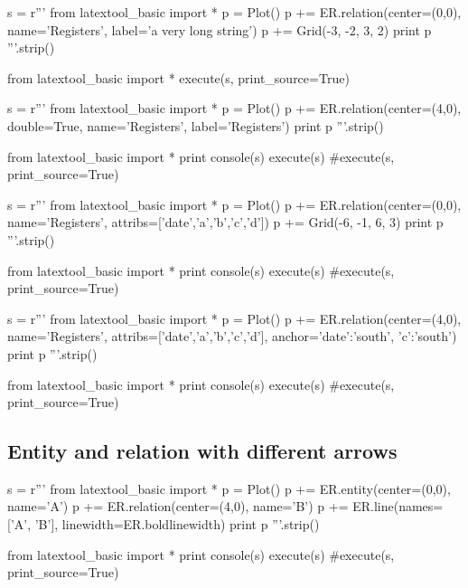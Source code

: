 \begin{python}
s = r'''
from latextool_basic import *
p = Plot()
p += ER.relation(center=(0,0), name='Registers', label='a very long string')
p += Grid(-3, -2, 3, 2)
print p
'''.strip()

from latextool_basic import *
execute(s, print_source=True)
\end{python}

\begin{python}
s = r'''
from latextool_basic import *
p = Plot()
p += ER.relation(center=(4,0), double=True,
                 name='Registers', label='Registers')
print p
'''.strip()

from latextool_basic import *
print console(s)
execute(s)
#execute(s, print_source=True)
\end{python}


\begin{python}
s = r'''
from latextool_basic import *
p = Plot()
p += ER.relation(center=(0,0),
                 name='Registers',
                 attribs=['date','a','b','c','d'])
p += Grid(-6, -1, 6, 3)
print p
'''.strip()

from latextool_basic import *
print console(s)
execute(s)
#execute(s, print_source=True)
\end{python}

\begin{python}
s = r'''
from latextool_basic import *
p = Plot()
p += ER.relation(center=(4,0),
                 name='Registers',
                 attribs=['date','a','b','c','d'],
                 anchor={'date':'south', 'c':'south'})
print p
'''.strip()

from latextool_basic import *
print console(s)
execute(s)
#execute(s, print_source=True)
\end{python}



\newpage
\subsection{Entity and relation with different arrows}
\begin{python}
s = r'''
from latextool_basic import *
p = Plot()
p += ER.entity(center=(0,0), name='A')
p += ER.relation(center=(4,0), name='B')
p += ER.line(names=['A', 'B'],
             linewidth=ER.boldlinewidth)
print p
'''.strip()

from latextool_basic import *
print console(s)
execute(s)
#execute(s, print_source=True)
\end{python}

